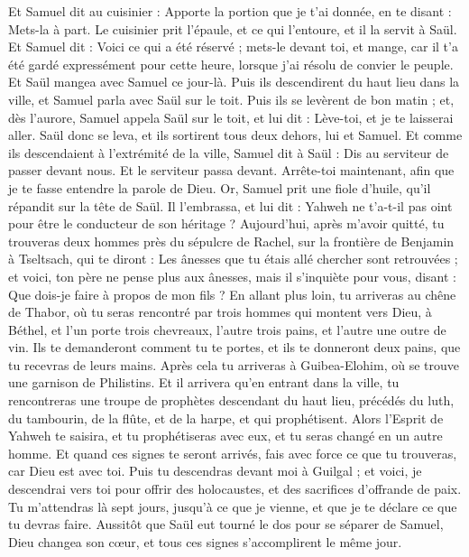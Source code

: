 \begin{multicols}{2}
Et Samuel dit au cuisinier : Apporte la portion que je t'ai donnée, en te disant : Mets-la à part.
Le cuisinier prit l'épaule, et ce qui l'entoure, et il la servit à Saül. Et Samuel dit : Voici ce qui a été réservé ; mets-le devant toi, et mange, car il t'a été gardé expressément pour cette heure, lorsque j'ai résolu de convier le peuple. Et Saül mangea avec Samuel ce jour-là.
Puis ils descendirent du haut lieu dans la ville, et Samuel parla avec Saül sur le toit.
Puis ils se levèrent de bon matin ; et, dès l'aurore, Samuel appela Saül sur le toit, et lui dit : Lève-toi, et je te laisserai aller. Saül donc se leva, et ils sortirent tous deux dehors, lui et Samuel.
Et comme ils descendaient à l'extrémité de la ville, Samuel dit à Saül : Dis au serviteur de passer devant nous. Et le serviteur passa devant. Arrête-toi maintenant, afin que je te fasse entendre la parole de Dieu.
\VerseOne{}Or, Samuel prit une fiole d'huile, qu'il répandit sur la tête de Saül. Il l'embrassa, et lui dit : Yahweh ne t'a-t-il pas oint pour être le conducteur de son héritage ?
Aujourd'hui, après m'avoir quitté, tu trouveras deux hommes près du sépulcre de Rachel, sur la frontière de Benjamin à Tseltsach, qui te diront : Les ânesses que tu étais allé chercher sont retrouvées ; et voici, ton père ne pense plus aux ânesses, mais il s'inquiète pour vous, disant : Que dois-je faire à propos de mon fils ?
En allant plus loin, tu arriveras au chêne de Thabor, où tu seras rencontré par trois hommes qui montent vers Dieu, à Béthel, et l'un porte trois chevreaux, l'autre trois pains, et l'autre une outre de vin.
Ils te demanderont comment tu te portes, et ils te donneront deux pains, que tu recevras de leurs mains.
Après cela tu arriveras à Guibea-Elohim, où se trouve une garnison de Philistins. Et il arrivera qu'en entrant dans la ville, tu rencontreras une troupe de prophètes descendant du haut lieu, précédés du luth, du tambourin, de la flûte, et de la harpe, et qui prophétisent.
Alors l'Esprit de Yahweh te saisira, et tu prophétiseras avec eux, et tu seras changé en un autre homme.
Et quand ces signes te seront arrivés, fais avec force ce que tu trouveras, car Dieu est avec toi.
Puis tu descendras devant moi à Guilgal ; et voici, je descendrai vers toi pour offrir des holocaustes, et des sacrifices d'offrande de paix. Tu m'attendras là sept jours, jusqu'à ce que je vienne, et que je te déclare ce que tu devras faire.
Aussitôt que Saül eut tourné le dos pour se séparer de Samuel, Dieu changea son cœur, et tous ces signes s'accomplirent le même jour.

\end{multicols}
